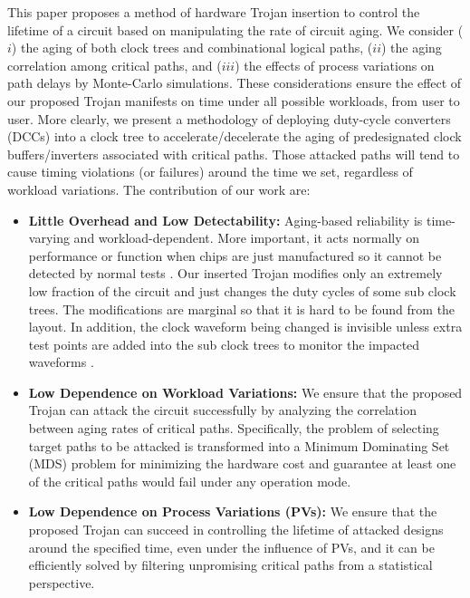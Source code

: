 This paper proposes a method of hardware Trojan insertion to control the lifetime of a circuit based on manipulating the rate of circuit aging. We consider ($i$) the aging of both clock trees and combinational logical paths, ($ii$) the aging correlation among critical paths, and ($iii$) the effects of process variations on path delays by Monte-Carlo simulations.  These considerations ensure the effect of our proposed Trojan manifests on time under all possible workloads, from user to user. More clearly, we present a methodology of deploying duty-cycle converters (DCCs) into a clock tree to accelerate/decelerate the aging of predesignated clock buffers/inverters associated with critical paths. Those attacked paths will tend to cause timing violations (or failures) around the time we set, regardless of workload variations. The contribution of our work are:
\begin{itemize}[leftmargin=*]%
	\item \textbf{Little Overhead and Low Detectability:} Aging-based reliability is time-varying and workload-dependent. More important, it acts normally on performance or function when chips are just manufactured so it cannot be detected by normal tests \cite{sreedhar2012reliability}. Our inserted Trojan modifies only an extremely low fraction of the circuit and just changes the duty cycles of some sub clock trees. The modifications are marginal so that it is hard to be found from the layout. In addition, the clock waveform being changed is invisible unless extra test points are added into the sub clock trees to monitor the impacted waveforms \cite{sreedhar2012reliability}.
	\item \textbf{Low Dependence on Workload Variations:} We ensure that the proposed Trojan can attack the circuit successfully by analyzing the correlation between aging rates of critical paths. Specifically, the problem of selecting target paths to be attacked is transformed into a Minimum Dominating Set (MDS) problem for minimizing the hardware cost and guarantee at least one of the critical paths would fail under any operation mode.
	\item \textbf{Low Dependence on Process Variations (PVs):} We ensure that the proposed Trojan can succeed in controlling the lifetime of attacked designs around the specified time, even under the influence of PVs, and it can be efficiently solved by filtering unpromising critical paths from a statistical perspective. 
\end{itemize}
